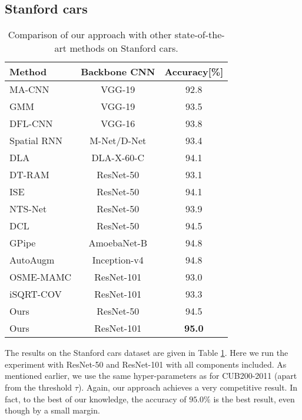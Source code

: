 \documentclass[10pt,twocolumn,letterpaper]{article}
\begin{document}
\subsection{Stanford cars}
\label{section:cars}
\begin{table}[h]
  \begin{center}
  \begin{tabular} {|l|c|c|}
    \hline
    Method & Backbone CNN &  Accuracy[\%] \\
    \hline
    \hline
    MA-CNN \cite{zheng2017learning} & VGG-19 &  92.8 \\
    GMM \cite{liang2018gmm} & VGG-19 &  93.5 \\
    DFL-CNN \cite{wang2018learning} & VGG-16  & 93.8 \\
    Spatial RNN \cite{wu2018deep} & M-Net/D-Net & 93.4\\
    DLA \cite{yu2018deep} & DLA-X-60-C  & 94.1 \\
    DT-RAM \cite{li2017dynamic} & ResNet-50 & 93.1 \\
    ISE \cite{simonelli2018increasingly} & ResNet-50 &  94.1 \\
    NTS-Net \cite{yang2018learning} & ResNet-50 & 93.9 \\
    DCL \cite{Chen_2019_CVPR} & ResNet-50 & 94.5 \\
    GPipe \cite{huang2018gpipe} & AmoebaNet-B &  94.8 \\
    AutoAugm \cite{cubuk2018autoaugment} & Inception-v4 &  94.8 \\
    OSME-MAMC \cite{sun2018multi} & ResNet-101 & 93.0 \\
    iSQRT-COV \cite{li2018towards} & ResNet-101 & 93.3 \\
    \hline
    Ours   & ResNet-50  & 94.5 \\
    Ours   & ResNet-101 &  \bf{95.0} \\
    \hline
  \end{tabular}
  \end{center}
  \caption{Comparison of our approach with other state-of-the-art methods on Stanford cars.}
  \label{table:cars}
\end{table}

The results on the Stanford cars dataset are given in Table \ref{table:cars}. Here we run the experiment with ResNet-50 and ResNet-101 with all components included. As mentioned earlier, we use the same hyper-parameters as for CUB200-2011 (apart from the threshold $\tau$). Again, our approach achieves a very competitive result. In fact, to the best of our knowledge, the accuracy of $95.0\%$ is the best result, even though by a small margin. 
\end{document}
